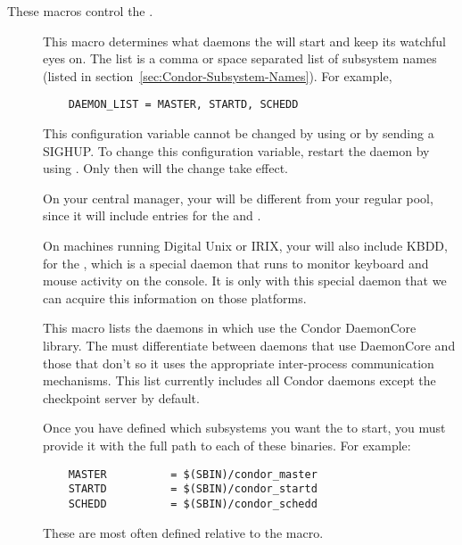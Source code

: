 These macros control the .
\begin{description}
  
\item[] \label{param:DaemonList} This macro
  determines what daemons the  will start and keep its
  watchful eyes on.  The list is a comma or space separated list of
  subsystem names (listed in
  section~\ref{sec:Condor-Subsystem-Names}).  For example,
  \begin{verbatim}
    DAEMON_LIST = MASTER, STARTD, SCHEDD
  \end{verbatim}

  \Note This configuration variable cannot be changed 
  by using  or 
  by sending a SIGHUP.
  To change this configuration variable, restart the
   daemon
  by using .
  Only then will the change take effect.

  \Note On your central manager, your 
  will be different from your regular pool, since it will include
  entries for the  and .  
  
  \Note On machines running Digital Unix or IRIX, your
   will also include KBDD, for the
  , which is a special daemon that runs to monitor
  keyboard and mouse activity on the console.  It is only with this
  special daemon that we can acquire this information on those
  platforms. 

\item[] \label{param:DCDaemonList} This macro
  lists the daemons in  which use the Condor
  DaemonCore library.  The  must differentiate between
  daemons that use DaemonCore and those that don't so it uses the
  appropriate inter-process communication mechanisms.  This list
  currently includes all Condor daemons except the checkpoint server
  by default.
  
\item[] \label{param:SUBSYS} Once you have defined which
  subsystems you want the  to start, you must provide
  it with the full path to each of these binaries.  For example:
  \begin{verbatim}
    MASTER          = $(SBIN)/condor_master
    STARTD          = $(SBIN)/condor_startd
    SCHEDD          = $(SBIN)/condor_schedd
  \end{verbatim}
  These are most often defined relative to the  macro.


\end{description}
